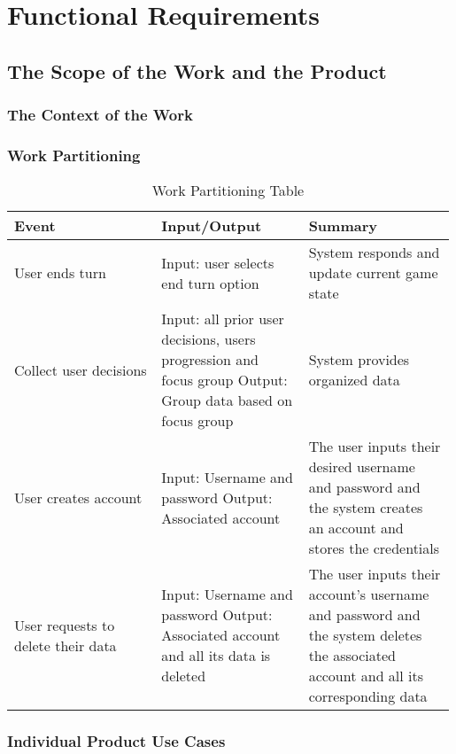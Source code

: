 \documentclass{article}
\begin{document}
\section{Functional Requirements}

\subsection{The Scope of the Work and the Product}

\subsubsection{The Context of the Work}


\subsubsection{Work Partitioning}
\begin{table}[h]
    \centering
    \begin{tabular}{|p{0.33\linewidth} | p{0.33\linewidth} | p{0.33\linewidth}| }
    \hline
         Event & Input/Output & Summary \\
         \hline
         User ends turn & Input: user selects end turn option & System responds and update current game state\\
         \hline 
         Collect user decisions & Input: all prior user decisions, users progression and focus group \newline Output: Group data based on focus group  & System provides organized data \\
         \hline 
          User creates account & Input: Username and password \newline Output: Associated account & The user inputs their desired username and password and the system creates an account and stores the credentials\\
         \hline 
         User requests to delete their data & Input: Username and password \newline Output: Associated account and all its data is deleted & The user inputs their account's username and password and the system deletes the associated account and all its corresponding data\\
         \hline 
    \end{tabular}
    \caption{Work Partitioning Table}
    \label{tab:my_label}
\end{table}
\newpage

\subsubsection{Individual Product Use Cases}
\end{document}
